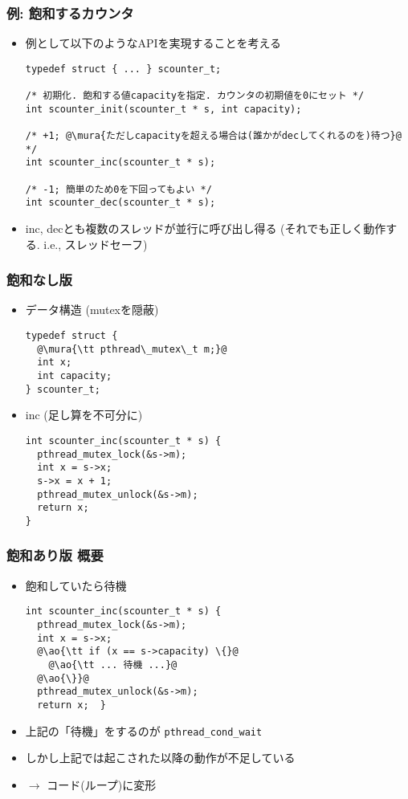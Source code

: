 \documentclass[12pt,dvipdfmx]{beamer}
\begin{document}
\begin{frame}[fragile]
  \frametitle{例: 飽和するカウンタ}
  \begin{itemize}
  \item 例として以下のようなAPIを実現することを考える
\begin{lstlisting}
typedef struct { ... } scounter_t;

/* 初期化. 飽和する値capacityを指定. カウンタの初期値を0にセット */
int scounter_init(scounter_t * s, int capacity);

/* +1; @\mura{ただしcapacityを超える場合は(誰かがdecしてくれるのを)待つ}@ */
int scounter_inc(scounter_t * s);

/* -1; 簡単のため0を下回ってもよい */
int scounter_dec(scounter_t * s);
\end{lstlisting}
\item inc, decとも複数のスレッドが並行に呼び出し得る
  (それでも正しく動作する. i.e., スレッドセーフ)
\end{itemize}
\end{frame}

\begin{frame}[fragile]
  \frametitle{飽和なし版}
  \begin{itemize}
  \item データ構造 (mutexを隠蔽)
\begin{lstlisting}
typedef struct {
  @\mura{\tt pthread\_mutex\_t m;}@
  int x;
  int capacity;
} scounter_t;
\end{lstlisting}
  \item inc (足し算を不可分に)
\begin{lstlisting}
int scounter_inc(scounter_t * s) {
  pthread_mutex_lock(&s->m);
  int x = s->x;
  s->x = x + 1;
  pthread_mutex_unlock(&s->m);
  return x;
}
\end{lstlisting}
\end{itemize}
\end{frame}

\begin{frame}[fragile]
  \frametitle{飽和あり版 概要}
  \begin{itemize}
  \item 飽和していたら待機
\begin{lstlisting}
int scounter_inc(scounter_t * s) {
  pthread_mutex_lock(&s->m);
  int x = s->x;
  @\ao{\tt if (x == s->capacity) \{}@
    @\ao{\tt ... 待機 ...}@
  @\ao{\}}@
  pthread_mutex_unlock(&s->m);
  return x;  }
\end{lstlisting}
\item 上記の「待機」をするのが {\tt pthread\_cond\_wait}
\item しかし上記では起こされた以降の動作が不足している
\item $\rightarrow$ コード(ループ)に変形
  \end{itemize}
\end{frame}
\end{document}
